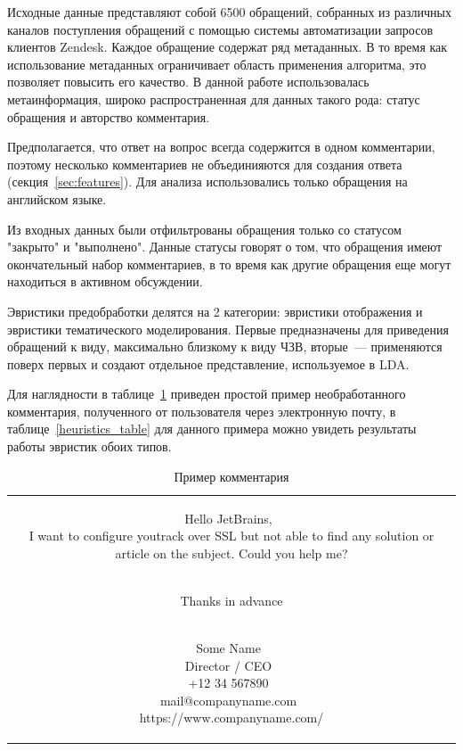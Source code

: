 Исходные данные представляют собой 6500 обращений, собранных из различных каналов поступления обращений с помощью системы автоматизации запросов клиентов Zendesk. Каждое обращение содержат ряд метаданных. В то время как использование метаданных ограничивает область применения алгоритма, это позволяет повысить его качество. В данной работе использовалась метаинформация, широко распространенная для данных такого рода: статус обращения и авторство комментария.

Предполагается, что ответ на вопрос всегда содержится в одном комментарии, поэтому несколько комментариев не объединияются для создания ответа (секция~\ref{sec:features}). Для анализа использовались только обращения на английском языке.

Из входных данных были отфильтрованы обращения только со статусом "закрыто" и "выполнено". Данные статусы говорят о том, что обращения  имеют окончательный набор комментариев, в то время как другие обращения еще могут находиться в активном обсуждении.

Эвристики предобработки делятся на 2 категории: эвристики отображения и эвристики тематического моделирования. Первые предназначены для приведения обращений к виду, максимально близкому к виду ЧЗВ, вторые~--- применяются поверх первых и создают отдельное представление, используемое в LDA.

Для наглядности в таблице~\ref{comment_example} приведен простой пример необработанного комментария, полученного от пользователя через электронную почту, в таблице~\ref{heuristics_table} для данного примера можно увидеть результаты работы эвристик обоих типов.

\begin{table}[!ht]
\caption{Пример комментария}
\label{comment_example}
\centering
\begin{tabular}{|c}
\parbox[t]{8cm}{Hello JetBrains,~\\ 
I want to configure youtrack over SSL but
not able to find any solution or article on the subject. Could you help me?

~\\
Thanks in advance

~\\
Some Name~\\
Director / CEO~\\
+12 34 567890~\\
mail@companyname.com~\\
https://www.companyname.com/} \\
\end{tabular}
\end{table}


